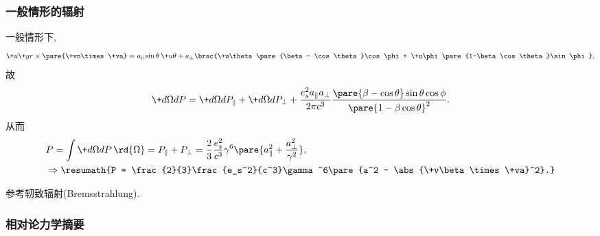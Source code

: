 \documentclass[hidelinks]{ctexart}
\begin{document}

\subsubsection{一般情形的辐射} %
\label{ssub:一般情形的辐射}

一般情形下,
\[ \+u{\+gr}\times\pare{\+vn\times \+va} = a_\parallel \sin\theta\,\+u\theta + a_\perp\brac{\+u\theta \pare{\beta - \cos\theta}\cos\phi + \+u\phi \pare{1-\beta\cos\theta}\sin\phi}, \]
故
\[ \+d{\Omega}dP = \+d\Omega d{P_\parallel} + \+d\Omega d{P_\perp} + \frac{e_s^2 a_\parallel a_\perp}{2\pi c^3} \frac{\pare{\beta - \cos\theta}\sin\theta\cos\phi}{\pare{1-\beta\cos\theta}^2}. \]
从而
\begin{align*}
    & P = \int \+d\Omega dP \,\rd{\Omega} = P_\parallel + P_\perp = \frac{2}{3}\frac{e_s^2}{c^3}\gamma^6 \pare{a_\parallel^2 + \frac{a_\perp^2}{\gamma^2}},\\
    & \Rightarrow \resumath{P = \frac{2}{3}\frac{e_s^2}{c^3}\gamma^6\pare{a^2 - \abs{\+v\beta\times \+va}^2}.}
\end{align*}
\begin{remark}
    参考轫致辐射(Bremsstrahlung).
\end{remark}


\subsubsection{相对论力学摘要} %
\label{ssub:相对论力学摘要}
\end{document}
